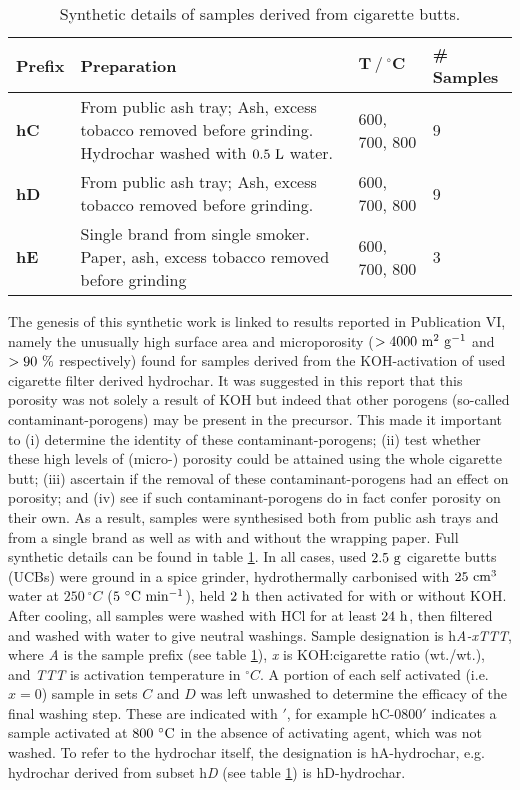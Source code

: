 \begin{table}[b]
    \caption{Synthetic details of samples derived from cigarette butts.}
    \label{tb:cb_synthesis}
    \begin{tabularx}{\textwidth}{lXll}
        \toprule
            \textbf{Prefix} & \textbf{Preparation} & $\mathbf{T\ /\ ^{\circ}C}$ & \textbf{\# Samples} \\ 
        \midrule
            \textbf{hC}     & From public ash tray; Ash, excess tobacco removed before grinding. Hydrochar washed with $\rm 0.5\ L$ water.              & 600, 700, 800 & 9              \\
            \textbf{hD}     &  From public ash tray; Ash, excess tobacco removed before grinding.             & 600, 700, 800 & 9             \\
            \textbf{hE}     & Single brand from single smoker. Paper, ash, excess tobacco removed before grinding              & 600, 700, 800 & 3              \\
        \bottomrule
    \end{tabularx}%
\end{table}

The genesis of this synthetic work is linked to results reported in Publication VI, namely the unusually high surface area and microporosity ($ \rm > 4000\ m^2\ g^{-1}$ and $\rm > 90\ \%$ respectively) found for samples derived from the KOH-activation of used cigarette filter derived hydrochar. It was suggested in this report that this porosity was not solely a result of KOH but indeed that other porogens (so-called contaminant-porogens) may be present in the precursor. This made it important to (i) determine the identity of these  contaminant-porogens; (ii) test whether these high levels of (micro-) porosity could be attained using the whole cigarette butt; (iii) ascertain if the removal of these contaminant-porogens had an effect on porosity; and (iv) see if such contaminant-porogens do in fact confer porosity on their own. As a result, samples were synthesised both from public ash trays and from a single brand as well as with and without the wrapping paper. Full synthetic details can be found in table \ref{tb:cb_synthesis}. In all cases, used $\rm 2.5\ g$ cigarette butts (UCBs) were ground in a spice grinder, hydrothermally carbonised with $\rm 25\ cm^3$ water at $250\ ^{\circ}C$ ($\rm 5\ ^{\circ}C\ min^{-1}$), held $\rm 2\ h$ then activated for with or without KOH. After cooling, all samples were washed with HCl for at least $\rm 24\ h$, then filtered and washed with water to give neutral washings. Sample designation is h\textit{A-xTTT}, where \textit{A} is the sample prefix (see table \ref{tb:cb_synthesis}), \textit{x} is KOH:cigarette ratio (wt./wt.), and \textit{TTT} is activation temperature in $^{\circ}C$. A portion of each self activated (i.e. $x = 0$) sample in sets $C$ and $D$ was left unwashed to determine the efficacy of the final washing step. These are indicated with $'$, for example hC-0800$'$ indicates a sample activated at $\rm 800\ ^{\circ}C$ in the absence of activating agent, which was not washed. To refer to the hydrochar itself, the designation is hA-hydrochar, e.g. hydrochar derived from subset h\textit{D} (see table \ref{tb:cb_synthesis}) is hD-hydrochar.

